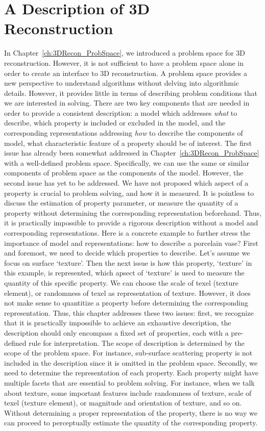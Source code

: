 
\chapter{A Description of 3D Reconstruction}
\label{ch:3DRecon_Desc}
In Chapter~\ref{ch:3DRecon_ProbSpace}, we introduced a problem space for 3D reconstruction. However, it is not sufficient to have a problem space alone in order to create an interface to 3D reconstruction. A problem space provides a new perspective to understand algorithms without delving into algorithmic details. However, it provides little in terms of describing problem conditions that we are interested in solving. There are two key components that are needed in order to provide a consistent description: a model which addresses \textit{what} to describe, \ie which property is included or excluded in the model, and the corresponding representations addressing \textit{how} to describe the components of model, \ie what characteristic feature of a property should be of interest. The first issue has already been somewhat addressed in Chapter~\ref{ch:3DRecon_ProbSpace} with a well-defined problem space. Specifically, we can use the same or similar components of problem space as the components of the model. However, the second issue has yet to be addressed. We have not proposed which aspect of a property is crucial to problem solving, and how it is measured. It is pointless to discuss the estimation of property parameter, or measure the quantity of a property without determining the corresponding representation beforehand. Thus, it is practically impossible to provide a rigorous description without a model and corresponding representations. Here is a concrete example to further stress the importance of model and representations: how to describe a porcelain vase? First and foremost, we need to decide which properties to describe. Let's assume we focus on surface `texture'. Then the next issue is how this property, `texture' in this example, is represented, \ie which apsect of `texture' is used to measure the quantity of this specific property. We can choose the scale of texel (texture element), or randomness of texel as representation of texture. However, it does not make sense to quantitize a property before determining the corresponding representation. Thus, this chapter addresses these two issues: first, we recognize that it is practically impossible to achieve an exhaustive description, the description should only encompass a fixed set of properties, each with a pre-defined rule for interpretation. The scope of description is determined by the scope of the problem space. For instance, sub-surface scattering property is not included in the description since it is omitted in the problem space. Secondly, we need to determine the representation of each property. Each property might have multiple facets that are essential to problem solving. For instance, when we talk about texture, some important features include randomness of texture, scale of texel (texture element), or magnitude and orientation of texture, and so on. Without determining a proper representation of the property, there is no way we can proceed to perceptually estimate the quantity of the corresponding property.
